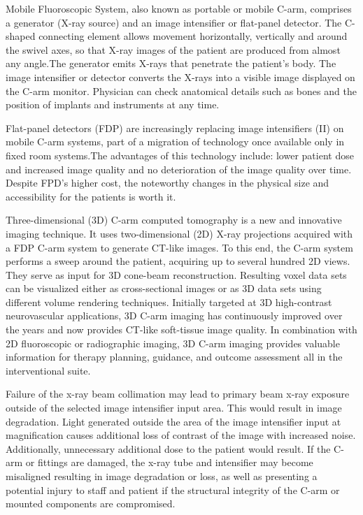 \documentclass[12pt]{article}
\begin{document}
\indent

Mobile Fluoroscopic System, also known as portable or mobile C-arm, comprises a generator (X-ray source) and an image intensifier or flat-panel detector. The C-shaped connecting element allows movement horizontally, vertically and around the swivel axes, so that X-ray images of the patient are produced from almost any angle.The generator emits X-rays that penetrate the patient’s body. The image intensifier or detector converts the X-rays into a visible image displayed on the C-arm monitor. Physician can check anatomical details such as bones and the position of implants and instruments at any time.

\indent

Flat-panel detectors (FDP) are increasingly replacing image intensifiers (II) on mobile C-arm systems, part of a migration of technology once available only in fixed room systems.The advantages of this technology include: lower patient dose and increased image quality and no deterioration of the image quality over time.
Despite FPD’s higher cost, the noteworthy changes in the physical size and accessibility for the patients is worth it.

\indent

Three-dimensional (3D) C-arm computed tomography is a new and innovative imaging technique. It uses two-dimensional (2D) X-ray projections acquired with a FDP C-arm system to generate CT-like images. To this end, the C-arm system performs a sweep around the patient, acquiring up to several hundred 2D views. They serve as input for 3D cone-beam reconstruction. Resulting voxel data sets can be visualized either as cross-sectional images or as 3D data sets using different volume rendering techniques. Initially targeted at 3D high-contrast neurovascular applications, 3D C-arm imaging has continuously improved over the years and  now provides CT-like soft-tissue image quality. In combination with 2D fluoroscopic or radiographic imaging, 3D C-arm imaging provides valuable information for therapy planning, guidance, and outcome assessment all in the interventional suite.

\indent

Failure of the x-ray beam collimation may lead to primary beam x-ray exposure outside of the selected image intensifier input area. This would result in image degradation. Light generated outside the area of the image intensifier input at magnification causes additional loss of contrast of the image with increased noise. Additionally, unnecessary additional dose to the patient would result. If the C-arm or fittings are damaged, the x-ray tube and intensifier may become misaligned resulting in image degradation or loss, as well as presenting a potential injury to staff and patient if the structural integrity of the C-arm or mounted components are compromised.
\end{document}
